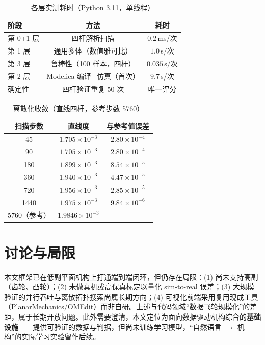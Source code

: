 \documentclass[UTF8,11pt,a4paper]{ctexart}
\begin{document}
\begin{table}[htbp]
\centering
\caption{各层实测耗时（Python 3.11，单线程）}
\label{tab:perf}
\begin{tabular}{lcc}
\toprule
阶段 & 方法 & 耗时 \\
\midrule
第 0+1 层 & 四杆解析扫描 & $0.2$\,ms/次 \\
第 1 层 & 通用多体（数值雅可比） & $1.0$\,s/次 \\
第 3 层 & 鲁棒性（100 样本，四杆） & $0.035$\,s/次 \\
第 2 层 & Modelica 编译+仿真（首次） & $9.7$\,s/次 \\
确定性 & 四杆验证重复 50 次 & 唯一评分 \\
\bottomrule
\end{tabular}
\end{table}

\begin{table}[htbp]
\centering
\caption{离散化收敛（直线四杆，参考步数 5760）}
\label{tab:conv}
\begin{tabular}{ccc}
\toprule
扫描步数 & 直线度 & 与参考值误差 \\
\midrule
45 & $1.705\times10^{-3}$ & $2.80\times10^{-4}$ \\
90 & $1.705\times10^{-3}$ & $2.80\times10^{-4}$ \\
180 & $1.899\times10^{-3}$ & $8.54\times10^{-5}$ \\
360 & $1.940\times10^{-3}$ & $4.47\times10^{-5}$ \\
720 & $1.956\times10^{-3}$ & $2.85\times10^{-5}$ \\
1440 & $1.975\times10^{-3}$ & $9.84\times10^{-6}$ \\
5760（参考） & $1.9846\times10^{-3}$ & --- \\
\bottomrule
\end{tabular}
\end{table}

\section{讨论与局限}
本文框架已在低副平面机构上打通端到端闭环，但仍存在局限：(1) 尚未支持高副（齿轮、凸轮）；(2) 未做真机或高保真标定以量化 sim-to-real 误差；(3) 大规模验证的并行吞吐与离散拓扑搜索尚属长期方向；(4) 可视化前端采用复用现成工具（PlanarMechanics/OMEdit）而非自研。上述与代码领域``数据飞轮规模化''的差距，属于长期开放问题。此外需要澄清，本文定位为面向数据驱动机构综合的\textbf{基础设施}——提供可验证的数据与判据，但尚未训练学习模型，``自然语言 $\rightarrow$ 机构''的实际学习实验留作后续。
\end{document}
